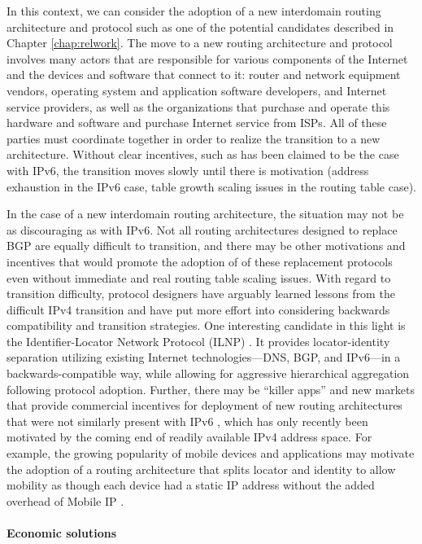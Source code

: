 In this context, we can consider the adoption of a new interdomain routing
architecture and protocol such as one of the potential candidates described in
Chapter \ref{chap:relwork}. The move to a new routing architecture and protocol
involves many actors that are responsible for various components of the
Internet and the devices and software that connect to it: router and network
equipment vendors, operating system and application software developers, and
Internet service providers, as well as the organizations that purchase and
operate this hardware and software and purchase Internet service from ISPs. All
of these parties must coordinate together in order to realize the transition to
a new architecture. Without clear incentives, such as has been claimed to be
the case with IPv6, the transition moves slowly until there is motivation
(address exhaustion in the IPv6 case, table growth scaling issues in the
routing table case).

In the case of a new interdomain routing architecture, the situation may not be
as discouraging as with IPv6. Not all routing architectures designed to replace
BGP are equally difficult to transition, and there may be other motivations and
incentives that would promote the adoption of of these replacement protocols
even without immediate and real routing table scaling issues. With regard to
transition difficulty, protocol designers have arguably learned lessons from
the difficult IPv4 transition and have put more effort into considering
backwards compatibility and transition strategies. One interesting candidate in
this light is the Identifier-Locator Network Protocol (ILNP)
\cite{Atkinson:2010zr}.  It provides locator-identity separation utilizing
existing Internet technologies---DNS, BGP, and IPv6---in a backwards-compatible
way, while allowing for aggressive hierarchical aggregation following protocol
adoption. Further, there may be ``killer apps'' and new markets that provide
commercial incentives for deployment of new routing architectures that were not
similarly present with IPv6 \cite{Li:2011vn}, which has only recently been
motivated by the coming end of readily available IPv4 address space. For
example, the growing popularity of mobile devices and applications may motivate
the adoption of a routing architecture that splits locator and identity to
allow mobility as though each device had a static IP address without the added
overhead of Mobile IP \cite{rfc3344}.


\paragraph{Economic solutions}

